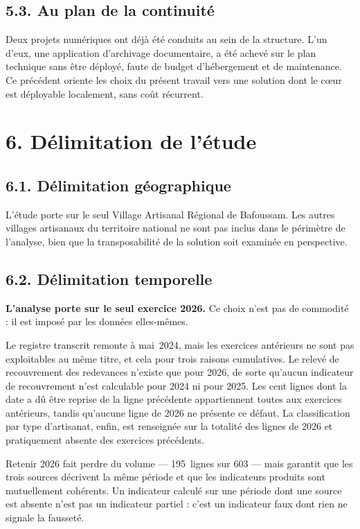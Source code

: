 \subsection*{5.3. Au plan de la continuité}

Deux projets numériques ont déjà été conduits au sein de la structure. L'un d'eux, une application d'archivage documentaire, a été achevé sur le plan technique sans être déployé, faute de budget d'hébergement et de maintenance. Ce précédent oriente les choix du présent travail vers une solution dont le cœur est déployable localement, sans coût récurrent.

\section*{6. Délimitation de l'étude}

\subsection*{6.1. Délimitation géographique}

L'étude porte sur le seul Village Artisanal Régional de Bafoussam. Les autres villages artisanaux du territoire national ne sont pas inclus dans le périmètre de l'analyse, bien que la transposabilité de la solution soit examinée en perspective.

\subsection*{6.2. Délimitation temporelle}

\textbf{L'analyse porte sur le seul exercice 2026.} Ce choix n'est pas de commodité : il est imposé par les données elles-mêmes.

Le registre transcrit remonte à mai~2024, mais les exercices antérieurs ne sont pas exploitables au même titre, et cela pour trois raisons cumulatives. Le relevé de recouvrement des redevances n'existe que pour 2026, de sorte qu'aucun indicateur de recouvrement n'est calculable pour 2024 ni pour 2025. Les cent lignes dont la date a dû être reprise de la ligne précédente appartiennent toutes aux exercices antérieurs, tandis qu'aucune ligne de 2026 ne présente ce défaut. La classification par type d'artisanat, enfin, est renseignée sur la totalité des lignes de 2026 et pratiquement absente des exercices précédents.

Retenir 2026 fait perdre du volume --- 195~lignes sur 603 --- mais garantit que les trois sources décrivent la même période et que les indicateurs produits sont mutuellement cohérents. Un indicateur calculé sur une période dont une source est absente n'est pas un indicateur partiel : c'est un indicateur faux dont rien ne signale la fausseté.

